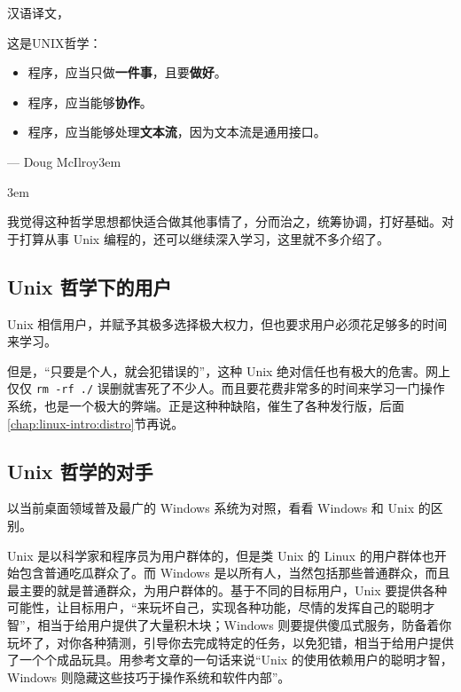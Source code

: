 \documentclass[doctor,openright,twoside]{sjtuthesis}
\def\VA#1#2{\addvspace{12pt}\raggedleft #1\rightskip3em\par #2\rightskip3em}
\renewenvironment{quote}
  {\list{}{\rightmargin\leftmargin}%
    \item\relax}
  {\endlist}
\providecommand{\tightlist}{%
    \setlength{\itemsep}{0pt}\setlength{\parskip}{0pt}}
\newcommand{\passthrough}[1]{#1}
\theoremstyle{plain}
\theoremstyle{definition}
\theoremstyle{remark}
\theoremstyle{ocrenumbox}
\theoremstyle{plain}
\newcommand\cqh{“}
\newcommand\cqt{”}
\begin{document}
汉语译文，

\begin{quote}
这是UNIX哲学：

\begin{itemize}
\tightlist
\item
  程序，应当只做\textbf{一件事}，且要\textbf{做好}。
\item
  程序，应当能够\textbf{协作}。
\item
  程序，应当能够处理\textbf{文本流}，因为文本流是通用接口。
\end{itemize}

\VA{--- Doug McIlroy}{}
\end{quote}

我觉得这种哲学思想都快适合做其他事情了，分而治之，统筹协调，打好基础。对于打算从事
Unix 编程的，还可以继续深入学习，这里就不多介绍了。

\hypertarget{unix-}{%
\subsection{Unix 哲学下的用户}\label{unix-}}

Unix
相信用户，并赋予其极多选择极大权力，但也要求用户必须花足够多的时间来学习。

但是，\cqh 只要是个人，就会犯错误的\cqt ，这种 Unix
绝对信任也有极大的危害。网上仅仅 \passthrough{\lstinline!rm -rf ./!}
误删就害死了不少人。而且要花费非常多的时间来学习一门操作系统，也是一个极大的弊端。正是这种种缺陷，催生了各种发行版，后面\ref{chap:linux-intro:distro}节再说。

\hypertarget{unix-}{%
\subsection{Unix 哲学的对手}\label{unix-}}

以当前桌面领域普及最广的 Windows 系统为对照，看看 Windows
和 Unix 的区别。

Unix 是以科学家和程序员为用户群体的，但是类 Unix 的 Linux
的用户群体也开始包含普通吃瓜群众了。而 Windows
是以所有人，当然包括那些普通群众，而且最主要的就是普通群众，为用户群体的。基于不同的目标用户，Unix
要提供各种可能性，让目标用户，\cqh 来玩坏自己，实现各种功能，尽情的发挥自己的聪明才智\cqt ，相当于给用户提供了大量积木块；Windows
则要提供傻瓜式服务，防备着你玩坏了，对你各种猜测，引导你去完成特定的任务，以免犯错，相当于给用户提供了一个个成品玩具。用参考文章的一句话来说\cqh Unix
的使用依赖用户的聪明才智，Windows
则隐藏这些技巧于操作系统和软件内部\cqt 。
\end{document}
